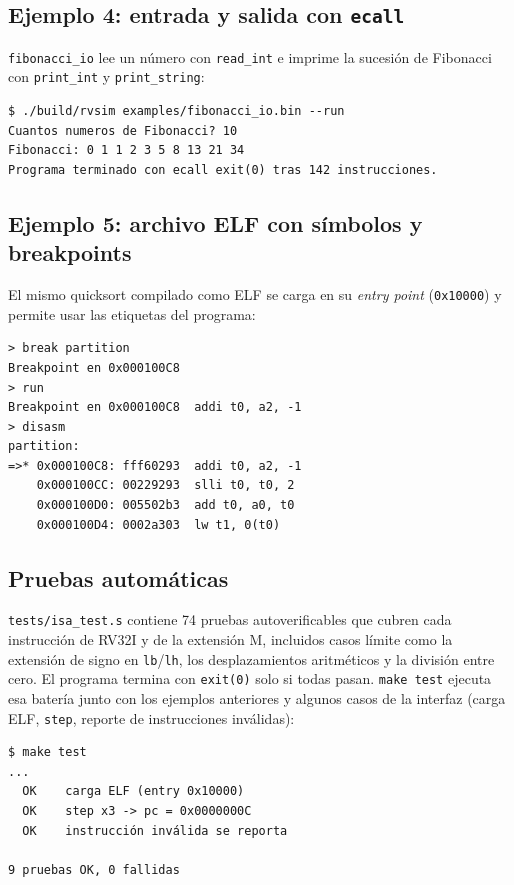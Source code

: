 \documentclass[11pt,a4paper]{article}
\begin{document}
\subsection{Ejemplo 4: entrada y salida con \texttt{ecall}}

\texttt{fibonacci\_io} lee un número con \texttt{read\_int} e imprime la sucesión de
Fibonacci con \texttt{print\_int} y \texttt{print\_string}:

\begin{Verbatim}
$ ./build/rvsim examples/fibonacci_io.bin --run
Cuantos numeros de Fibonacci? 10
Fibonacci: 0 1 1 2 3 5 8 13 21 34
Programa terminado con ecall exit(0) tras 142 instrucciones.
\end{Verbatim}

\subsection{Ejemplo 5: archivo ELF con símbolos y breakpoints}

El mismo quicksort compilado como ELF se carga en su \textit{entry point}
(\texttt{0x10000}) y permite usar las etiquetas del programa:

\begin{Verbatim}
> break partition
Breakpoint en 0x000100C8
> run
Breakpoint en 0x000100C8  addi t0, a2, -1
> disasm
partition:
=>* 0x000100C8: fff60293  addi t0, a2, -1
    0x000100CC: 00229293  slli t0, t0, 2
    0x000100D0: 005502b3  add t0, a0, t0
    0x000100D4: 0002a303  lw t1, 0(t0)
\end{Verbatim}

\subsection{Pruebas automáticas}

\texttt{tests/isa\_test.s} contiene 74 pruebas autoverificables que cubren cada
instrucción de RV32I y de la extensión M, incluidos casos límite como la extensión de
signo en \texttt{lb}/\texttt{lh}, los desplazamientos aritméticos y la división entre
cero. El programa termina con \texttt{exit(0)} solo si todas pasan.
\texttt{make test} ejecuta esa batería junto con los ejemplos anteriores y algunos casos
de la interfaz (carga ELF, \texttt{step}, reporte de instrucciones inválidas):

\begin{Verbatim}
$ make test
...
  OK    carga ELF (entry 0x10000)
  OK    step x3 -> pc = 0x0000000C
  OK    instrucción inválida se reporta

9 pruebas OK, 0 fallidas
\end{Verbatim}
\end{document}
